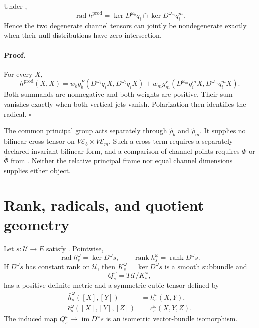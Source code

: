 Under ,
\begin{equation}
\operatorname{rad}h^{\mathrm{prod}}
=\ker D^{\omega_b}q_i\cap\ker D^{\omega_m}q_i^m.
\label{eq:pb-product-radical}
\end{equation}
Hence the two degenerate channel tensors can jointly be nondegenerate exactly
when their null distributions have zero intersection.  

\paragraph{Proof.}
For every $X$,
\[
h^{\mathrm{prod}}(X,X)
=w_bg_b^F(D^{\omega_b}q_iX,D^{\omega_b}q_iX)
+w_mg_m^F(D^{\omega_m}q_i^mX,D^{\omega_m}q_i^mX).
\]
Both summands are nonnegative and both weights are positive.  Their sum
vanishes exactly when both vertical jets vanish.  Polarization then identifies
the radical.  $\square$

The common principal group acts separately through $\widehat\rho_b$ and
$\widehat\rho_m$.  It supplies no bilinear cross tensor on
$V\mathcal E_b\times V\mathcal E_m$.  Such a cross term requires a separately
declared invariant bilinear form, and a comparison of channel points requires
$\Phi$ or $\widetilde\Phi$ from .  Neither the
relative principal frame nor equal channel dimensions supplies either object.

\section{Rank, radicals, and quotient geometry}
\label{sec:pb-rank-quotient}

Let $s:\mathcal U\to E$ satisfy
.  Pointwise,
\begin{equation}
\operatorname{rad}h_s^\omega
=\ker D^\omega s,
\qquad
\operatorname{rank}h_s^\omega
=\operatorname{rank}D^\omega s.
\label{eq:pb-pullback-radical-rank}
\end{equation}
If $D^\omega s$ has constant rank on $\mathcal U$, then
$K_s^\omega=\ker D^\omega s$ is a smooth subbundle and
\begin{equation}
Q_s^\omega=T\mathcal U/K_s^\omega,
\label{eq:pb-pullback-quotient-bundle}
\end{equation}
has a positive-definite metric and a symmetric cubic tensor defined by
\begin{align}
\bar h_s^\omega([X],[Y])
&=h_s^\omega(X,Y),
\label{eq:pb-pullback-quotient-metric}\\
\bar c_s^\omega([X],[Y],[Z])
&=c_s^\omega(X,Y,Z).
\label{eq:pb-pullback-quotient-amari}
\end{align}
The induced map $Q_s^\omega\to\operatorname{im}D^\omega s$ is an isometric
vector-bundle isomorphism.  

